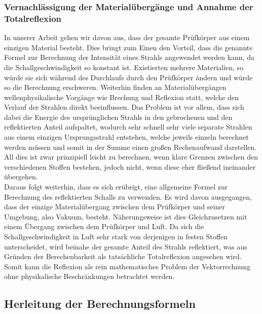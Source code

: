 \documentclass[reducespace,stylepage,semiarbeit]{spezidoc}
\begin{document}
\subsubsection{Vernachlässigung der Materialübergänge und Annahme der Totalreflexion}
In unserer Arbeit gehen wir davon aus, dass der gesamte Prüfkörper aus einem einzigen Material besteht. 
Dies bringt zum Einen den Vorteil, dass die genannte Formel zur Berechnung der Intensität eines Strahls angewendet werden kann, da die Schallgeschwindigkeit so konstant ist. 
Existierten mehrere Materialien, so würde sie sich während des Durchlaufs durch den Prüfkörper ändern und würde so die Berechnung erschweren. 
Weiterhin finden an Materialübergängen wellenphysikalische Vorgänge wie Brechung und Reflexion statt, welche den Verlauf der Strahlen direkt beeinflussen. 
Das Problem ist vor allem, dass sich dabei die Energie des ursprünglichen Strahls in den gebrochenen und den reflektierten Anteil aufspaltet, wodurch sehr schnell sehr viele separate Strahlen aus einem einzigen Ursprungsstrahl entstehen, welche jeweils einzeln berechnet werden müssen und somit in der Summe einen großen Rechenaufwand darstellen. 
All dies ist zwar prinzipiell leicht zu berechnen, wenn klare Grenzen zwischen den verschiedenen Stoffen bestehen, jedoch nicht, wenn diese eher \glqq fließend\grqq{} ineinander übergehen.\\
Daraus folgt weiterhin, dass es sich erübrigt, eine allgemeine Formel zur Berechnung des reflektierten Schalls zu verwenden. 
Es wird davon ausgegangen, dass der einzige Materialübergang zwischen dem Prüfkörper und seiner Umgebung, also Vakuum, besteht. 
Näherungsweise ist dies Gleichzusetzen mit einem Übergang zwischen dem Prüfkörper und Luft. 
Da sich die Schallgeschwindigkeit in Luft sehr stark von derjenigen in festen Stoffen unterscheidet, wird beinahe der gesamte Anteil des Strahls reflektiert, was aus Gründen der Berechenbarkeit als tatsächliche Totalreflexion angesehen wird. 
Somit kann die Reflexion als rein mathematisches Problem der Vektorrechnung ohne physikalische Beschränkungen betrachtet werden.

\subsection{Herleitung der Berechnungsformeln}\label{sec:herleitung}

\end{document}
